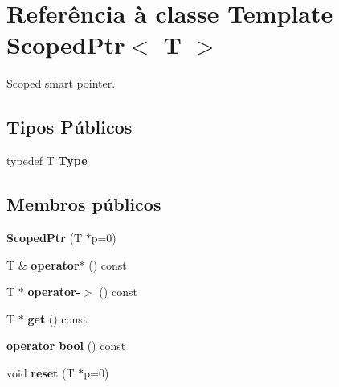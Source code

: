 \hypertarget{class_scoped_ptr}{\section{Referência à classe Template Scoped\-Ptr$<$ T $>$}
\label{class_scoped_ptr}
}


Scoped smart pointer.  


\subsection*{Tipos Públicos}
\begin{DoxyCompactItemize}
\item 
\hypertarget{class_scoped_ptr_a685b7a70f0ae1f2881cf8937d951c3b1}{typedef T {\bfseries Type}}\label{class_scoped_ptr_a685b7a70f0ae1f2881cf8937d951c3b1}

\end{DoxyCompactItemize}
\subsection*{Membros públicos}
\begin{DoxyCompactItemize}
\item 
\hypertarget{class_scoped_ptr_ab8eaaf2bb18200b0849cb758319f5434}{{\bfseries Scoped\-Ptr} (T $\ast$p=0)}\label{class_scoped_ptr_ab8eaaf2bb18200b0849cb758319f5434}

\item 
\hypertarget{class_scoped_ptr_abcc36ef133f26e7e3145b785df23eb18}{T \& {\bfseries operator$\ast$} () const }\label{class_scoped_ptr_abcc36ef133f26e7e3145b785df23eb18}

\item 
\hypertarget{class_scoped_ptr_ac0ddd007dfcfef3121f74d0665dfd0cd}{T $\ast$ {\bfseries operator-\/$>$} () const }\label{class_scoped_ptr_ac0ddd007dfcfef3121f74d0665dfd0cd}

\item 
\hypertarget{class_scoped_ptr_a07f851191ad3a7c5c1598ef14f710f96}{T $\ast$ {\bfseries get} () const }\label{class_scoped_ptr_a07f851191ad3a7c5c1598ef14f710f96}

\item 
\hypertarget{class_scoped_ptr_aa385aa18f5e42db5a415c25a90f4193d}{{\bfseries operator bool} () const }\label{class_scoped_ptr_aa385aa18f5e42db5a415c25a90f4193d}

\item 
\hypertarget{class_scoped_ptr_ad6a89b4fd7364e5104563003e8d0a008}{void {\bfseries reset} (T $\ast$p=0)}\label{class_scoped_ptr_ad6a89b4fd7364e5104563003e8d0a008}

\end{DoxyCompactItemize}


